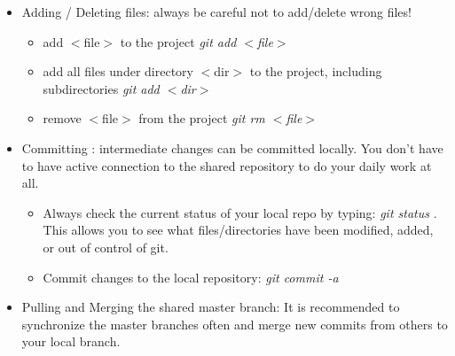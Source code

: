 \begin{itemize}
\begin{itemize}
          \item creating a branch in the central git: \textit{git push origin origin:refs/heads/branch-name} . This command is not
          allowed for average developer unless the branch name has a prefix
          matching the developer's LLNL OUN. Please ask ROSE administrator to create a remote branch if needed.
          \item start working on (switch to) a branch: \textit{git checkout branch-name} 
          \item deleting a local branch: \textit{git branch -d branch-name} 
          \item deleting a remote branch: \textit{git push origin
          :branch-name } . Again, we have access control so developers can
          only delete their own branches, not others'.
   \end{itemize}     
\item Adding / Deleting files: always be careful not to add/delete wrong files!
   \begin{itemize}
          \item add $<$file$>$ to the project \textit{git add $<$file$>$}
          \item add all files under directory $<$dir$>$ to the project, including subdirectories \textit{git add $<$dir$>$}
	  \item remove $<$file$>$ from the project \textit{git rm $<$file$>$}
   \end{itemize}     
\item Committing : intermediate changes can be committed locally. You don't have to have active connection to the shared repository to do your daily work at all. 
   \begin{itemize}
          \item Always check the current status of your local repo by
          typing:
          \textit{git status}  .  This allows you to see what
          files/directories have been
          modified, added, or out of control of git. 
          \item Commit changes to the local repository: \textit{git commit -a} 
   \end{itemize}   
\item Pulling and Merging the shared master branch: It is recommended to synchronize the master branches often and merge new commits from others to  your local branch. 
   \begin{itemize}

\end{itemize}
\end{itemize}
